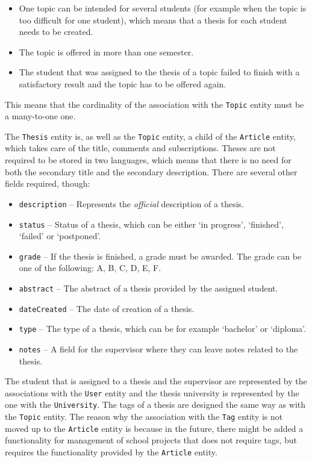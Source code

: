 \begin{itemize}
    \item One topic can be intended for several students (for example when the topic is too difficult for one student), which means that a thesis for each student needs to be created.
    \item The topic is offered in more than one semester.
    \item The student that was assigned to the thesis of a topic failed to finish with a satisfactory result and the topic has to be offered again.
\end{itemize}

This means that the cardinality of the association with the \texttt{Topic} entity must be a many-to-one one.

The \texttt{Thesis} entity is, as well as the \texttt{Topic} entity, a child of the \texttt{Article} entity, which takes care of the title, comments and subscriptions. Theses are not required to be stored in two languages, which means that there is no need for both the secondary title and the secondary description. There are several other fields required, though:

\begin{itemize}
    \item \texttt{description} -- Represents the \emph{official} description of a thesis.
    \item \texttt{status} -- Status of a thesis, which can be either `in progress', `finished', `failed' or `postponed'.
    \item \texttt{grade} -- If the thesis is finished, a grade must be awarded. The grade can be one of the following: A, B, C, D, E, F.
    \item \texttt{abstract} -- The abstract of a thesis provided by the assigned student.
    \item \texttt{dateCreated} -- The date of creation of a thesis.
    \item \texttt{type} -- The type of a thesis, which can be for example `bachelor' or `diploma'.
    \item \texttt{notes} -- A field for the supervisor where they can leave notes related to the thesis.
\end{itemize}

The student that is assigned to a thesis and the supervisor are represented by the associations with the \texttt{User} entity and the thesis university is represented by the one with the \texttt{University}. The tags of a thesis are designed the same way as with the \texttt{Topic} entity. The reason why the association with the \texttt{Tag} entity is not moved up to the \texttt{Article} entity is because in the future, there might be added a functionality for management of school projects that does not require tags, but requires the functionality provided by the \texttt{Article} entity.

